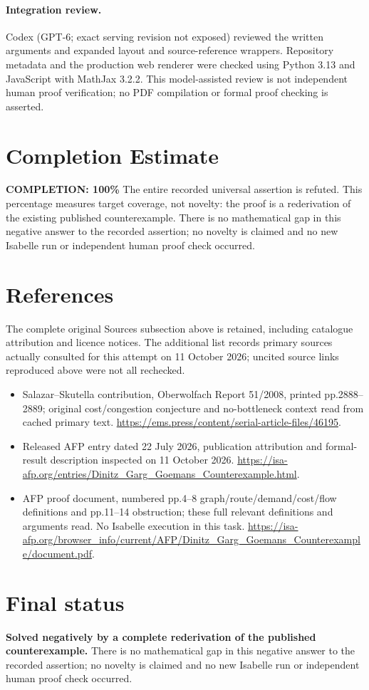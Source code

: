 \documentclass[11pt]{article}
\begin{document}
\paragraph{Integration review.} Codex (GPT-6; exact serving revision not exposed) reviewed the written arguments and expanded layout and source-reference wrappers. Repository metadata and the production web renderer were checked using Python 3.13 and JavaScript with MathJax 3.2.2. This model-assisted review is not independent human proof verification; no PDF compilation or formal proof checking is asserted.

\section{Completion Estimate}
\noindent\textbf{COMPLETION: 100\%}
The entire recorded universal assertion is refuted. This percentage measures target coverage, not novelty: the proof is a rederivation of the existing published counterexample. There is no mathematical gap in this negative answer to the recorded assertion; no novelty is claimed and no new Isabelle run or independent human proof check occurred.
\section{References}
The complete original Sources subsection above is retained, including catalogue attribution and licence notices. The additional list records primary sources actually consulted for this attempt on 11 October 2026; uncited source links reproduced above were not all rechecked.
\begin{itemize}
\item Salazar--Skutella contribution, Oberwolfach Report 51/2008, printed pp.2888--2889; original cost/congestion conjecture and no-bottleneck context read from cached primary text. \url{https://ems.press/content/serial-article-files/46195}.
\item Released AFP entry dated 22 July 2026, publication attribution and formal-result description inspected on 11 October 2026. \url{https://isa-afp.org/entries/Dinitz_Garg_Goemans_Counterexample.html}.
\item AFP proof document, numbered pp.4--8 graph/route/demand/cost/flow definitions and pp.11--14 obstruction; these full relevant definitions and arguments read. No Isabelle execution in this task. \url{https://isa-afp.org/browser_info/current/AFP/Dinitz_Garg_Goemans_Counterexample/document.pdf}.
\end{itemize}
\section{Final status}
\textbf{Solved negatively by a complete rederivation of the published counterexample.} There is no mathematical gap in this negative answer to the recorded assertion; no novelty is claimed and no new Isabelle run or independent human proof check occurred.
\end{document}
